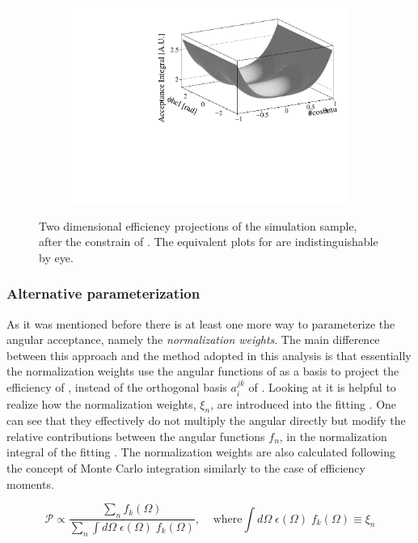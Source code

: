 \begin{figure}[h]
\begin{subfigure}{0.5\textwidth}
    \includegraphics[width=\textwidth]{Figures/Chapter4/canv_cosThL_phi_Sim08_3fb_hel_negKaons_all.pdf}
    \caption{}
    \label{eff2D_lp}
  \end{subfigure}
\caption{Two dimensional efficiency projections of the \BsJpsiKst simulation sample, after the constrain of .
         The equivalent plots for \BsbarJpsiKst are indistinguishable by eye.}
    \label{eff2D}
\end{figure}

\subsubsection{Alternative parameterization}
As it was mentioned before there is at least one more way to parameterize the angular acceptance, namely the \emph{normalization weights}.
The main difference between this approach and the method adopted in this analysis is that essentially the normalization weights use the angular functions
of  as a basis to project the efficiency of , instead of the orthogonal basis $a_i^{jk}$ of .
Looking at  it is helpful to realize how the normalization weights, $\xi_n$, are introduced into the fitting \pdf. 
One can see that they effectively do not multiply the angular \pdf directly but modify the relative contributions between the angular functions
$f_n$, in the normalization integral of the fitting \pdf. The normalization weights are also calculated following the concept of Monte Carlo integration
similarly to the case of efficiency moments.

\begin{equation}
  \mathcal{P} \propto \frac{\sum_n f_k(\Omega)}{\sum_n \int d\Omega \; \epsilon(\Omega) \; f_k(\Omega)}, \;\;\;\;\text{where} \int d\Omega \; \epsilon(\Omega) \; f_k(\Omega) \equiv \xi_n 
  \label{norm_weights_pdf}
\end{equation}


